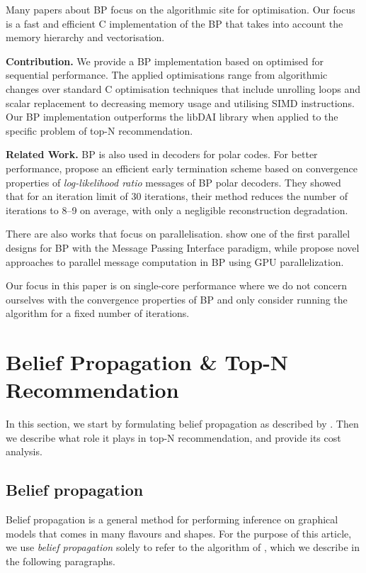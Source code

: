 \documentclass[final,letterpaper]{article}
\newcommand{\mypar}[1]{{\bf #1.}}
\begin{document}
Many papers about BP focus on the algorithmic site for optimisation. Our focus is a fast and efficient C implementation of the BP that takes into account the memory hierarchy and vectorisation.

\mypar{Contribution}
We provide a BP implementation based on \citet{top-n-recommendation} optimised for sequential performance. The applied optimisations range from algorithmic changes over standard C optimisation techniques that include unrolling loops and scalar replacement to decreasing memory usage and utilising SIMD instructions. Our BP implementation outperforms the libDAI library \cite{libdai} when applied to the specific problem of top-N recommendation. 

\mypar{Related Work}
BP is also used in decoders for polar codes. For better performance, \citet{related1} propose an efficient early termination scheme based on convergence properties of \emph{log-likelihood ratio} messages of BP polar decoders. They showed that for an iteration limit of 30 iterations, their method reduces the number of iterations to 8--9 on average, with only a negligible reconstruction degradation.

There are also works that focus on parallelisation. \citet{related2} show one of the first parallel designs for BP with the Message Passing Interface paradigm, while \citet{related3} propose novel approaches to parallel message computation in BP using GPU parallelization.

Our focus in this paper is on single-core performance where we do not concern ourselves with the convergence properties of BP and only consider running the algorithm for a fixed number of iterations.

\section{Belief Propagation \& Top-N Recommendation}\label{sec:background}

In this section, we start by formulating belief propagation as described by \citet{top-n-recommendation}. Then we describe what role it plays in top-N
recommendation, and provide its cost analysis.

\subsection{Belief propagation} \label{subsec:bp}

Belief propagation is a general method for performing inference on
graphical models that comes in many flavours and shapes. For the purpose of
this article, we use \emph{belief propagation} solely to refer to the algorithm
of \citet[Section 2.1]{top-n-recommendation}, which we describe in the
following paragraphs.
\end{document}
